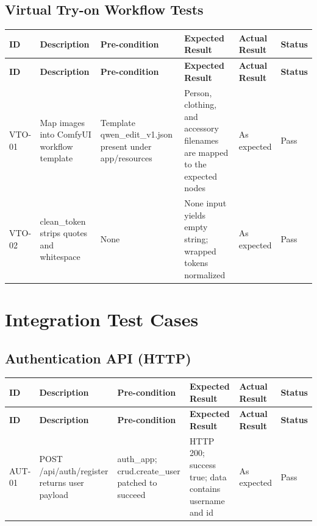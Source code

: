 \begin{appendices}
{\subsection*{Virtual Try-on Workflow Tests}
\begin{longtable}{|p{1.2cm}|p{3.0cm}|p{2.8cm}|p{3.2cm}|p{2.2cm}|p{1.1cm}|}
\hline
\textbf{ID} & \textbf{Description} & \textbf{Pre-condition} & \textbf{Expected Result} & \textbf{Actual Result} & \textbf{Status} \\
\hline
\endfirsthead
\hline
\textbf{ID} & \textbf{Description} & \textbf{Pre-condition} & \textbf{Expected Result} & \textbf{Actual Result} & \textbf{Status} \\
\hline
\endhead
\hline
\endfoot

VTO-01 &
Map images into ComfyUI workflow template &
Template qwen\_edit\_v1.json present under app/resources &
Person, clothing, and accessory filenames are mapped to the expected nodes &
As expected &
Pass \\
\hline

VTO-02 &
clean\_token strips quotes and whitespace &
None &
None input yields empty string; wrapped tokens normalized &
As expected &
Pass \\
\hline

\end{longtable}
}



\section{Integration Test Cases}
\label{appendix:integration_testing}

{\small
\renewcommand{\arraystretch}{1.2}
\setlength{\tabcolsep}{4pt}

\subsection*{Authentication API (HTTP)}
\begin{longtable}{|p{1.2cm}|p{3.0cm}|p{3.0cm}|p{3.2cm}|p{2.2cm}|p{1.1cm}|}
\hline
\textbf{ID} & \textbf{Description} & \textbf{Pre-condition} & \textbf{Expected Result} & \textbf{Actual Result} & \textbf{Status} \\
\hline
\endfirsthead
\hline
\textbf{ID} & \textbf{Description} & \textbf{Pre-condition} & \textbf{Expected Result} & \textbf{Actual Result} & \textbf{Status} \\
\hline
\endhead
\hline
\endfoot

AUT-01 &
POST /api/auth/register returns user payload &
auth\_app; crud.create\_user patched to succeed &
HTTP 200; success true; data contains username and id &
As expected &
Pass \\
\hline


\end{longtable}}
\end{appendices}

